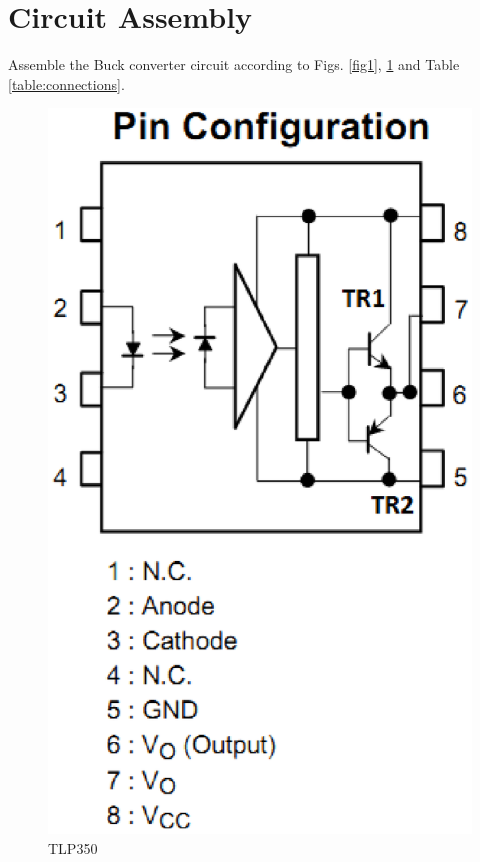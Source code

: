 \documentclass[journal,12pt,twocolumn]{IEEEtran}
\begin{document}
\section{Circuit Assembly}
\begin{problem}
Assemble the Buck converter circuit according to Figs. \ref{fig1}, \ref{fig5} and Table \ref{table:connections}.
\end{problem}

\begin{figure}[!h]
\centering
\includegraphics[width=\columnwidth]{./figs/pinout.eps}
\caption{ TLP350}  
\label{fig5}
\end{figure}
\end{document}
